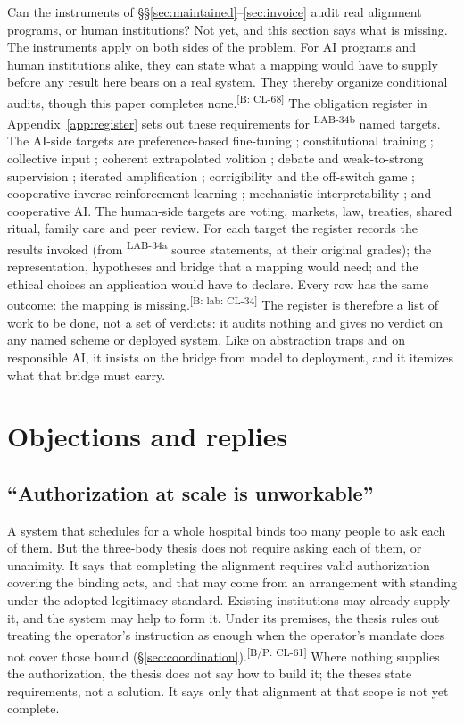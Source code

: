 \documentclass[pdflatex,sn-basic]{sn-jnl}%
\newcommand{\slot}[1]{}%
\newcommand{\claim}[2]{\ifannotated\textsuperscript{\textcolor{blue!60!black}{\tiny[#1: #2]}}\fi}
\newcommand{\rec}[1]{\ifannotated\textsuperscript{\textcolor{blue!60!black}{\tiny#1}}\fi}
\newcommand{\enquote}[1]{``#1''}
\begin{document}
\slot{9.1}
Can the instruments of \S\S\ref{sec:maintained}--\ref{sec:invoice} audit real alignment programs, or human institutions? Not yet, and this section says what is missing. The instruments apply on both sides of the problem. For AI programs and human institutions alike, they can state what a mapping would have to supply before any result here bears on a real system. They thereby organize conditional audits, though this paper completes none.\claim{B}{CL-68} The obligation register in Appendix~\ref{app:register} sets out these requirements for \numCFifteenTargets\rec{LAB-34b} named targets. The AI-side targets are preference-based fine-tuning \citep{ouyang2022}; constitutional training \citep{bai2022}; collective input \citep{huang2024}; coherent extrapolated volition \citep{yudkowsky2004}; debate and weak-to-strong supervision \citep{irving2018,burns2023}; iterated amplification \citep{christiano2018}; corrigibility and the off-switch game \citep{hadfieldmenell2017offswitch}; cooperative inverse reinforcement learning \citep{hadfieldmenell2016cirl}; mechanistic interpretability \citep{elhage2022}; and cooperative AI. The human-side targets are voting, markets, law, treaties, shared ritual, family care and peer review. For each target the register records the results invoked (from \numCFifteenSnapshots\rec{LAB-34a} source statements, at their original grades); the representation, hypotheses and bridge that a mapping would need; and the ethical choices an application would have to declare. Every row has the same outcome: the mapping is missing.\claim{B: lab}{CL-34} The register is therefore a list of work to be done, not a set of verdicts: it audits nothing and gives no verdict on any named scheme or deployed system. Like \citet{selbst2019} on abstraction traps and \citet{dignum2019} on responsible AI, it insists on the bridge from model to deployment, and it itemizes what that bridge must carry.

\section{Objections and replies}\label{sec:objections}
\subsection{\enquote{Authorization at scale is unworkable}}

\slot{10.1}
A system that schedules for a whole hospital binds too many people to ask each of them. But the three-body thesis does not require asking each of them, or unanimity. It says that completing the alignment requires valid authorization covering the binding acts, and that may come from an arrangement with standing under the adopted legitimacy standard. Existing institutions may already supply it, and the system may help to form it. Under its premises, the thesis rules out treating the operator's instruction as enough when the operator's mandate does not cover those bound (\S\ref{sec:coordination}).\claim{B/P}{CL-61} Where nothing supplies the authorization, the thesis does not say how to build it; the theses state requirements, not a solution. It says only that alignment at that scope is not yet complete.
\end{document}
